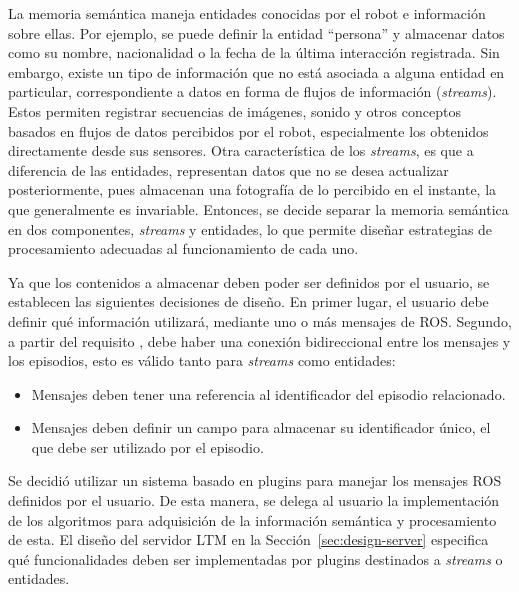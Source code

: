 La memoria semántica maneja entidades conocidas por el robot e información sobre ellas. Por ejemplo, se puede definir la entidad ``persona'' y almacenar datos como su nombre, nacionalidad o la fecha de la última interacción registrada. Sin embargo, existe un tipo de información que no está asociada a alguna entidad en particular, correspondiente a datos en forma de flujos de información (\textit{streams}). Estos permiten registrar secuencias de imágenes, sonido y otros conceptos basados en flujos de datos percibidos por el robot, especialmente los obtenidos directamente desde sus sensores. Otra característica de los \textit{streams}, es que a diferencia de las entidades, representan datos que no se desea actualizar posteriormente, pues almacenan una fotografía de lo percibido en el instante, la que generalmente es invariable. Entonces, se decide separar la memoria semántica en dos componentes, \textit{streams} y entidades, lo que permite diseñar estrategias de procesamiento adecuadas al funcionamiento de cada uno. 


Ya que los contenidos a almacenar deben poder ser definidos por el usuario, se establecen las siguientes decisiones de diseño. En primer lugar, el usuario debe definir qué información utilizará, mediante uno o más mensajes de ROS. Segundo, a partir del requisito , debe haber una conexión bidireccional entre los mensajes y los episodios, esto es válido tanto para \textit{streams} como entidades:
\begin{itemize}
\item Mensajes deben tener una referencia al identificador del episodio relacionado.
\item Mensajes deben definir un campo para almacenar su identificador único, el que debe ser utilizado por el episodio.
\end{itemize}

Se decidió utilizar un sistema basado en plugins para manejar los mensajes ROS definidos por el usuario. De esta manera, se delega al usuario la implementación de los algoritmos para adquisición de la  información semántica y procesamiento de esta. El diseño del servidor LTM en la Sección~\ref{sec:design-server} especifica qué funcionalidades deben ser implementadas por plugins destinados a \textit{streams} o entidades. 


